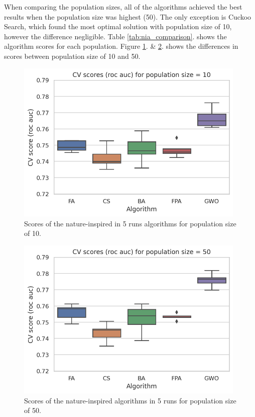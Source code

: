 \documentclass[runningheads]{llncs}
\begin{document}
When comparing the population sizes, all of the algorithms achieved the best results when the population size was highest (50). The only exception is Cuckoo Search, which found the most optimal solution with population size of 10, however the difference negligible. Table \ref{tab:nia_comparison}. shows the algorithm scores for each population. Figure \ref{fig:nia_train_score_by_algorithm_1}. \& \ref{fig:nia_train_score_by_algorithm_2}. shows the differences in scores between population size of 10 and 50.


\begin{figure}
    \centering
    \includegraphics[width=11cm]{figures/nia_train_score_by_algorithm_10}
    \caption{Scores of the nature-inspired in 5 runs algorithms for population size of 10.}
    \label{fig:nia_train_score_by_algorithm_1}
\end{figure}

\begin{figure}
    \centering
    \includegraphics[width=11cm]{figures/nia_train_score_by_algorithm_50}
    \caption{Scores of the nature-inspired algorithms in 5 runs for population size of 50.}
    \label{fig:nia_train_score_by_algorithm_2}
\end{figure}
\end{document}
